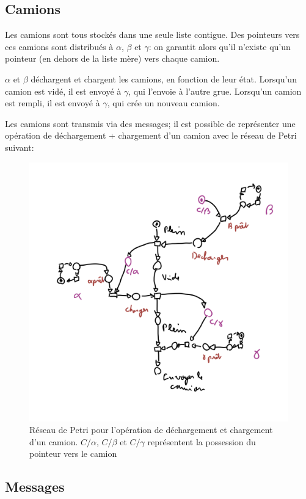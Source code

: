 \documentclass[12pt]{article}
\begin{document}
\subsection{Camions}

Les camions sont tous stockés dans une seule liste contigue.
Des pointeurs vers ces camions sont distribués à $\alpha$, $\beta$ et $\gamma$: on garantit alors qu'il n'existe qu'un pointeur (en dehors de la liste mère) vers chaque camion.

$\alpha$ et $\beta$ déchargent et chargent les camions, en fonction de leur état. Lorsqu'un camion est vidé, il est envoyé à $\gamma$, qui l'envoie à l'autre grue.
Lorsqu'un camion est rempli, il est envoyé à $\gamma$, qui crée un nouveau camion.

Les camions sont transmis via des messages; il est possible de représenter une opération de déchargement + chargement d'un camion avec le réseau de Petri suivant:

\begin{figure}[H]
    \includegraphics[width=0.95\columnwidth]{truck.png}
    \caption{Réseau de Petri pour l'opération de déchargement et chargement d'un camion. $C/\alpha$, $C/\beta$ et $C/\gamma$ représentent la possession du pointeur vers le camion\label{fig:petri-truck}}
\end{figure}

\subsection{Messages}
\end{document}
